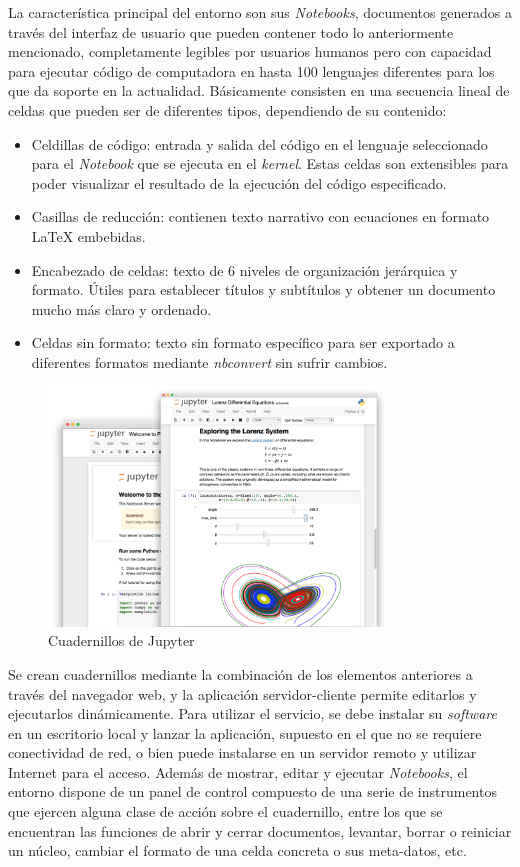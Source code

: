 La característica principal del entorno son sus \textit{Notebooks}, documentos generados a través del interfaz de usuario que pueden contener todo lo anteriormente mencionado, completamente legibles por usuarios humanos pero con capacidad para ejecutar código de computadora en hasta 100 lenguajes diferentes para los que da soporte en la actualidad. Básicamente consisten en una
secuencia lineal de celdas que pueden ser de diferentes tipos, dependiendo de su contenido:
\begin{itemize}
\item Celdillas de código: entrada y salida del código en el lenguaje seleccionado para el \textit{Notebook} que se ejecuta en el \textit{kernel}. Estas celdas son extensibles para poder visualizar el resultado de la ejecución del código especificado.
\item Casillas de reducción: contienen texto narrativo con ecuaciones en formato LaTeX embebidas.
\item Encabezado de celdas: texto de 6 niveles de organización jerárquica y formato. Útiles para establecer títulos y subtítulos y obtener un documento mucho más claro y ordenado.
\item Celdas sin formato: texto sin formato específico para ser exportado a diferentes formatos mediante \textit{nbconvert} sin sufrir cambios.
\end{itemize}

\begin{figure}[!hbtp]  \centering\noindent
    \includegraphics[width=0.8\textwidth]{figures/jupyterpreview.png}
    \caption{Cuadernillos de Jupyter}
    \label{jppreview}
\end{figure}

Se crean cuadernillos mediante la combinación de los elementos anteriores a través del navegador web, y la aplicación servidor-cliente permite editarlos y ejecutarlos dinámicamente. Para utilizar el servicio, se debe instalar su \textit{software} en un escritorio local y lanzar la aplicación, supuesto en el que no se requiere conectividad de red, o bien puede instalarse en un servidor remoto y utilizar Internet para el acceso. Además de mostrar, editar y ejecutar \textit{Notebooks}, el entorno dispone de un panel de control compuesto de una serie de instrumentos que ejercen alguna clase de acción sobre el cuadernillo, entre los que se encuentran las funciones de abrir y cerrar documentos, levantar, borrar o reiniciar un núcleo, cambiar el formato de una celda concreta o sus meta-datos, etc.

